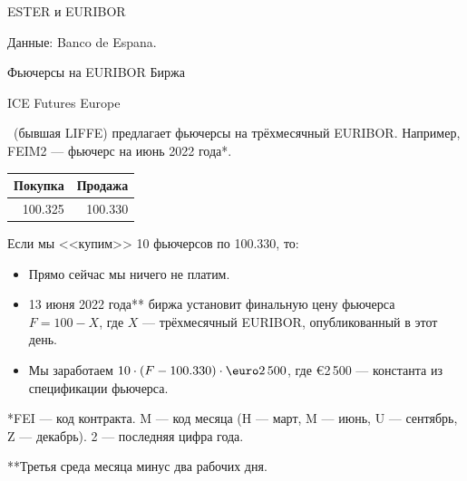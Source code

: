 \documentclass{beamer}
\renewcommand{\EUR}[1]{\textup{\euro}#1}
\newcommand{\en}[1]{\begin{otherlanguage}{english}#1\end{otherlanguage}}
\begin{document}
\newcommand{\plotBenchmarkRate}[2] {
	
	\addplot[
		color = #2,
		mark = none,
		thick
	]
	table[
		x=date,
		y=#1,
		col sep=comma
	]
	{euro_benchmark.csv};
}



\begin{frame}{ESTER и EURIBOR}
\centering
{}

\scriptsize Данные: Banco de Espana.
\end{frame}



\begin{frame}{Фьючерсы на EURIBOR}
\justify
Биржа \en{ICE Futures Europe}\ (бывшая LIFFE) предлагает фьючерсы на трёхмесячный EURIBOR. Например, \alert{FEIM2} --- фьючерс на июнь 2022 года*.

\justify
\centering
\begin{tabular}{r|r}
Покупка & Продажа \\ \hline
100.325 & 100.330
\end{tabular}

\justify
Если мы <<купим>> 10 фьючерсов по 100.330, то:
\begin{itemize}
\justifying
\item Прямо сейчас мы ничего не платим.
\item 13 июня 2022 года** биржа установит финальную цену фьючерса $F = 100 - X$, где 
$X$ --- трёхмесячный EURIBOR, опубликованный в этот день.
\item Мы заработаем $10 \cdot (F - 100.330) \cdot \EUR{2\,500}$, где \EUR{2\,500} --- 
константа из спецификации фьючерса.
\end{itemize}

\justify
*FEI --- код контракта. M --- код месяца (H --- март, M --- июнь, U --- сентябрь, Z --- 
декабрь). 2 --- последняя цифра года.

\justify
**Третья среда месяца минус два рабочих дня.
\end{frame}
\end{document}
